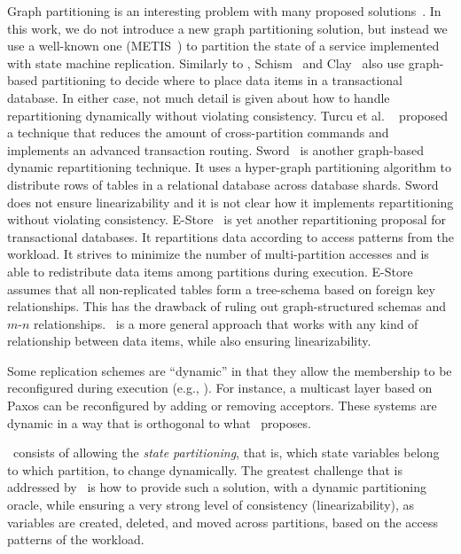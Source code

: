Graph partitioning is an interesting problem with many proposed
solutions~\cite{Abou-Rjeili:2006,hendrickson2000graph,kernighan1970efficient,7004087}.
In this work, we do not introduce a new graph partitioning solution, but instead
we use a well-known one (METIS~\cite{Abou-Rjeili:2006}) to partition the state
of a service implemented with state machine replication. Similarly to
\dynastar{}, Schism~\cite{curino2010sch} and Clay~\cite{SerafiniTEPAS16} also
use graph-based partitioning to decide where to place data items in a
transactional database. In either case, not much detail is given about how to
handle repartitioning dynamically without violating consistency. Turcu et al.
~\cite{7004087} proposed a technique that reduces the amount of cross-partition
commands and implements an advanced transaction routing.
Sword~\cite{quamar2013sword} is another graph-based dynamic repartitioning
technique. It uses a hyper-graph partitioning algorithm to distribute rows of
tables in a relational database across database shards. Sword does not ensure
linearizability and it is not clear how it implements repartitioning without
violating consistency. E-Store~\cite{taft2014est} is yet another repartitioning
proposal for transactional databases. It repartitions data according to access
patterns from the workload. It strives to minimize the number of multi-partition
accesses and is able to redistribute data items among partitions during
execution. E-Store assumes that all non-replicated tables form a tree-schema
based on foreign key relationships. This has the drawback of ruling out
graph-structured schemas and \mbox{$m$-$n$} relationships. \dynastar\ is a more
general approach that works with any kind of relationship between data items,
while also ensuring linearizability.

Some replication schemes are ``dynamic'' in that they allow the membership to be
reconfigured during execution (e.g.,
\cite{birman2010dsr,dustdar2007soc,guessoum2003dar}). For instance, a multicast
layer based on Paxos can be reconfigured by adding or removing acceptors. These
systems are dynamic in a way that is orthogonal to what \dynastar\ proposes.

\dynastar\ consists of allowing the \emph{state partitioning}, that is, which
state variables belong to which partition, to change dynamically. The greatest
challenge that is addressed by \dynastar\ is how to provide such a solution,
with a dynamic partitioning oracle, while ensuring a very strong level of
consistency (linearizability), as variables are created, deleted, and moved
across partitions, based on the access patterns of the workload.

